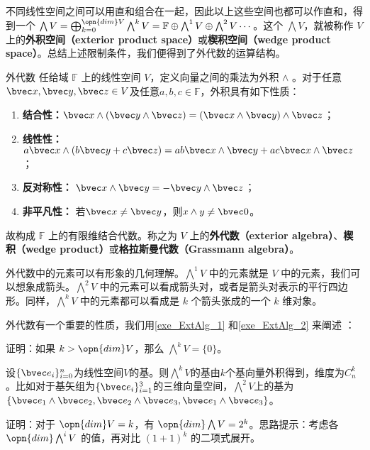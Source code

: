 不同线性空间之间可以用直和组合在一起，因此以上这些空间也都可以作直和，得到一个 $\bigwedge V=\bigoplus^{\opn{dim}V}_{k=0}\bigwedge^k V=\mathbb{F}\oplus\bigwedge^1V\oplus\bigwedge^2V\cdots$。这个 $\bigwedge V$，就被称作 $V$ 上的\textbf{外积空间（exterior product space）}或\textbf{楔积空间（wedge product space）}。总结上述限制条件，我们便得到了外代数的运算结构。
\begin{definition}{外代数}
任给域 $\mathbb{F}$ 上的线性空间 $V$，定义向量之间的乘法为外积 $\wedge$ 。对于任意$\bvec x,\bvec y,\bvec z\in V$及任意$a,b,c\in \mathbb F$，外积具有如下性质：
\begin{enumerate}
\item \textbf{结合性：}$\bvec x\wedge (\bvec y\wedge \bvec z)=(\bvec x\wedge \bvec y)\wedge \bvec z$；
\item \textbf{线性性：}$a\bvec x\wedge(b\bvec y+c\bvec z)=ab\bvec x\wedge \bvec y+ac\bvec x\wedge\bvec z$；
\item \textbf{反对称性：} $\bvec x\wedge \bvec y=-\bvec y\wedge\bvec z$；
\item \textbf{非平凡性：} 若$\bvec x\neq\bvec y$，则$x\wedge y\neq \bvec 0 $。
\end{enumerate}

故构成 $\mathbb{F}$ 上的有限维结合代数。称之为 $V$ 上的\textbf{外代数（exterior algebra）}、\textbf{楔积（wedge product）}或\textbf{格拉斯曼代数（Grassmann algebra）}。
\end{definition}


外代数中的元素可以有形象的几何理解。$\bigwedge^1 V$ 中的元素就是 $V$ 中的元素，我们可以想象成箭头。$\bigwedge^2 V$ 中的元素可以看成箭头对，或者是箭头对表示的平行四边形。同样，$\bigwedge^k V$ 中的元素都可以看成是 $k$ 个箭头张成的一个 $k$ 维对象。

外代数有一个重要的性质，我们用\autoref{exe_ExtAlg_1} 和\autoref{exe_ExtAlg_2} 来阐述 ：

\begin{exercise}{}\label{exe_ExtAlg_1}
证明：如果 $k>\opn{dim} V$，那么 $\bigwedge^kV=\{0\}$。
\end{exercise}
设$\{\bvec e_i\}^n_{i=0}$为线性空间$V$的基。则$\bigwedge ^k V$的基由$k$个基向量外积得到，维度为$C_n^k$。比如对于基矢组为$\{\bvec e_i\}^3_{i=1}$的三维向量空间，$\bigwedge^2 V $上的基为$\{\bvec e_1\wedge \bvec e_2,\bvec e_2\wedge \bvec e_3,\bvec e_1\wedge \bvec e_3\}$。

\begin{exercise}{}\label{exe_ExtAlg_2}
证明：对于 $\opn{dim} V=k$，有 $\opn{dim} \bigwedge V=2^k$。思路提示：考虑各 $\opn{dim}\bigwedge^iV$ 的值，再对比 $(1+1)^k$ 的二项式展开。
\end{exercise}

